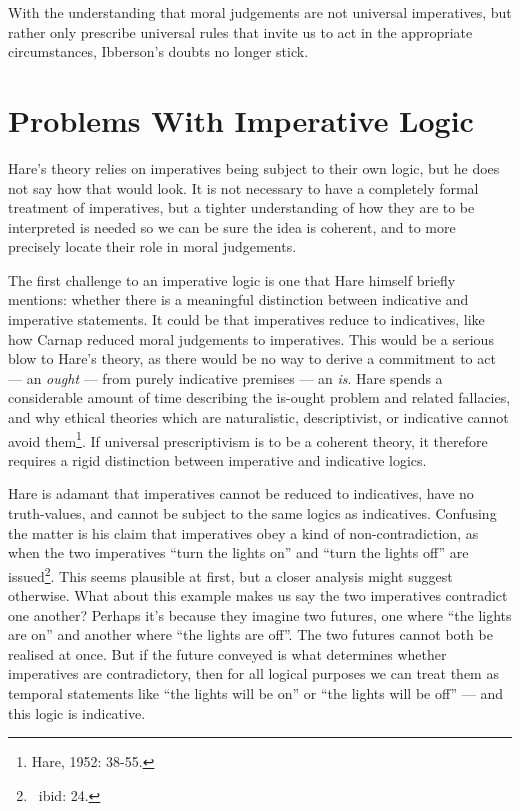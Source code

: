 \documentclass[12pt]{article}
\begin{document}
With the understanding that moral judgements are not universal imperatives, but rather only prescribe universal rules that invite us to act in the appropriate circumstances, Ibberson's doubts no longer stick.

\section{Problems With Imperative Logic}

Hare's theory relies on imperatives being subject to their own logic, but he does not say how that would look. It is not necessary to have a completely formal treatment of imperatives, but a tighter understanding of how they are to be interpreted is needed so we can be sure the idea is coherent, and to more precisely locate their role in moral judgements.

The first challenge to an imperative logic is one that Hare himself briefly mentions: whether there is a meaningful distinction between indicative and imperative statements. It could be that imperatives reduce to indicatives, like how Carnap reduced moral judgements to imperatives. This would be a serious blow to Hare's theory, as there would be no way to derive a commitment to act --- an \textit{ought} --- from purely indicative premises --- an \textit{is}. Hare spends a considerable amount of time describing the is-ought problem and related fallacies, and why ethical theories which are naturalistic, descriptivist, or indicative cannot avoid them\footnote{Hare, 1952: 38-55.}. If universal prescriptivism is to be a coherent theory, it therefore requires a rigid distinction between imperative and indicative logics.

Hare is adamant that imperatives cannot be reduced to indicatives, have no truth-values, and cannot be subject to the same logics as indicatives. Confusing the matter is his claim that imperatives obey a kind of non-contradiction, as when the two imperatives ``turn the lights on'' and ``turn the lights off'' are issued\footnote{~ibid: 24.}. This seems plausible at first, but a closer analysis might suggest otherwise. What about this example makes us say the two imperatives contradict one another? Perhaps it's because they imagine two futures, one where ``the lights are on'' and another where ``the lights are off''. The two futures cannot both be realised at once. But if the future conveyed is what determines whether imperatives are contradictory, then for all logical purposes we can treat them as temporal statements like ``the lights will be on'' or ``the lights will be off'' --- and this logic is indicative.
\end{document}
